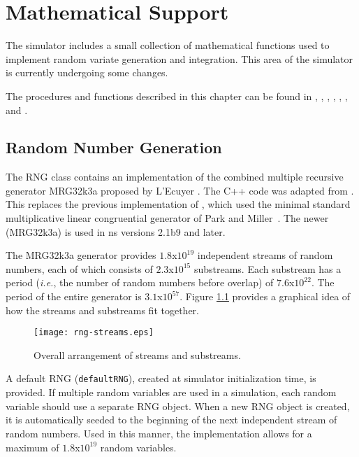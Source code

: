 %
%

\chapter{Mathematical Support}
\label{chap:math}

The simulator includes a small collection of mathematical
functions used to implement random variate generation and integration.
This area of the simulator is currently undergoing some
changes.

The procedures and functions described in this chapter can be found in
,
,
,
,
,
, and
.


\section{Random Number Generation}
\label{sec:random}

The RNG class contains an implementation of the combined multiple
recursive generator MRG32k3a proposed by L'Ecuyer
\cite{lecuyer99}. The C++ code was adapted from \cite{lecuyer01}.
This replaces the previous implementation of , which used
the minimal standard multiplicative linear congruential generator of
Park and Miller~\cite{Park88:Random}.  The newer (MRG32k3a)  is
used in ns versions 2.1b9 and later.

The MRG32k3a generator provides $1.8$x$10^{19}$ independent
streams of random numbers, each of which consists of
$2.3$x$10^{15}$ substreams. Each substream has a period
(\emph{i.e.}, the number of random numbers before overlap) of
$7.6$x$10^{22}$. The period of the entire generator is
$3.1$x$10^{57}$. Figure \ref{streams} provides a graphical idea of
how the streams and substreams fit together.
\begin{figure}[ht]
\centering
\texttt{[image: rng-streams.eps]}
\caption{Overall arrangement of streams and substreams.
\cite{lecuyer01}} \label{streams}
\end{figure}

A default RNG ({\tt defaultRNG}), created at simulator initialization
time, is provided. If multiple random variables are used in a
simulation, each random variable should use a separate RNG object.
When a new RNG object is created, it is automatically seeded to
the beginning of the next independent stream of random numbers.
Used in this manner, the implementation allows for a maximum of
$1.8$x$10^{19}$ random variables.

